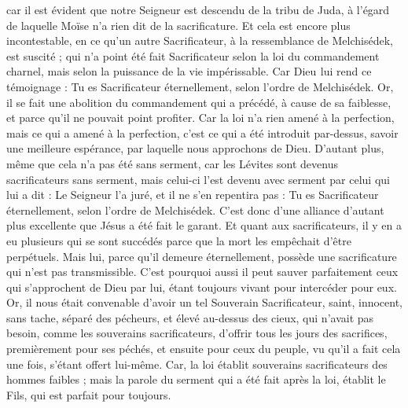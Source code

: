 \begin{multicols}{2}
car il est évident que notre Seigneur est descendu de la tribu de Juda, à l'égard de laquelle Moïse n'a rien dit de la sacrificature.
Et cela est encore plus incontestable, en ce qu'un autre Sacrificateur, à la ressemblance de Melchisédek, est suscité ;
qui n'a point été fait Sacrificateur selon la loi du commandement charnel, mais selon la puissance de la vie impérissable.
Car Dieu  lui rend ce témoignage : Tu es Sacrificateur éternellement, selon l'ordre de Melchisédek.
Or, il se fait une abolition du commandement qui a précédé, à cause de sa faiblesse, et parce qu'il ne pouvait point profiter.
Car la loi n'a rien amené à la perfection, mais ce qui a amené à la perfection, c'est ce qui a été introduit par-dessus, savoir une meilleure espérance, par laquelle nous approchons de Dieu.
D'autant plus, même que cela n'a pas été sans serment,
car les Lévites sont devenus sacrificateurs sans serment, mais celui-ci l'est devenu avec serment par celui qui lui a dit : Le Seigneur l'a juré, et il ne s'en repentira pas : Tu es Sacrificateur éternellement, selon l'ordre de Melchisédek.
C'est donc d'une alliance d'autant plus excellente que Jésus a été fait le garant.
Et quant aux sacrificateurs, il y en a eu plusieurs qui se sont succédés parce que la mort les empêchait d'être perpétuels.
Mais lui, parce qu'il demeure éternellement, possède une sacrificature qui n'est pas transmissible.
C'est pourquoi aussi il peut sauver parfaitement ceux qui s'approchent de Dieu par lui, étant toujours vivant pour intercéder pour eux.
Or, il nous était convenable d'avoir un tel Souverain Sacrificateur, saint, innocent, sans tache, séparé des pécheurs, et élevé au-dessus des cieux,
qui n'avait pas besoin, comme les souverains sacrificateurs, d'offrir tous les jours des sacrifices, premièrement pour ses péchés, et ensuite pour ceux du peuple, vu qu'il a fait cela une fois, s'étant offert lui-même.
Car, la loi établit souverains sacrificateurs des hommes faibles ; mais la parole du serment qui a été fait après la loi, établit le Fils, qui est parfait pour toujours.

\end{multicols}

